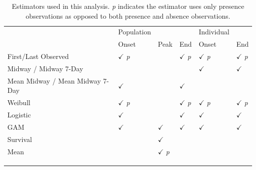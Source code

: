 \begin{table}
    \caption[Estimators used in this analysis]{Estimators used in this analysis. \emph{p} indicates the
    estimator uses only presence observations as opposed to both presence
    and absence observations.} \label{table-3-1}
    \begin{tabularx}{6.5in}{XXXXXX}
        \hline
        & Population & & & Individual &\tabularnewline
        & Onset & Peak & End & Onset & End\tabularnewline
        \hline
        First/Last Observed & \(\checkmark\) \emph{p} & & \(\checkmark\)
        \emph{p} & \(\checkmark\) \emph{p} & \(\checkmark\)
        \emph{p}\tabularnewline
        Midway / Midway 7-Day & & & & \(\checkmark\) &
        \(\checkmark\)\tabularnewline
        Mean Midway / Mean Midway 7-Day & \(\checkmark\) & & \(\checkmark\) &
        &\tabularnewline
        Weibull & \(\checkmark\) \emph{p} & & \(\checkmark\) \emph{p} &
        \(\checkmark\) \emph{p} & \(\checkmark\) \emph{p}\tabularnewline
        Logistic & \(\checkmark\) & & \(\checkmark\) & \(\checkmark\) &
        \(\checkmark\)\tabularnewline
        GAM & \(\checkmark\) & \(\checkmark\) & \(\checkmark\) & \(\checkmark\)
        & \(\checkmark\)\tabularnewline
        Survival & & \(\checkmark\) & & &\tabularnewline
        Mean & & \(\checkmark\) \emph{p} & & &\tabularnewline
        & & & & &\tabularnewline
        & & & & &\tabularnewline
        & & & & &\tabularnewline
    \end{tabularx}
\end{table}


